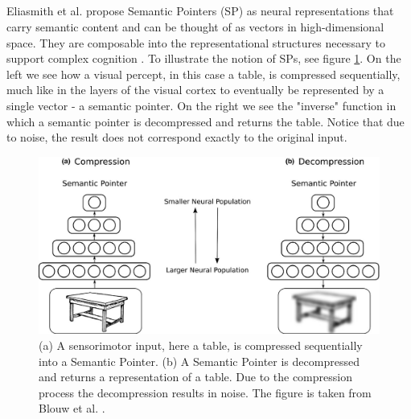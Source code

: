 \subsection{}
Eliasmith et al. propose Semantic Pointers (SP) as neural representations that carry semantic content and can be thought of as vectors in high-dimensional space. They are composable into the representational structures necessary to support complex cognition \cite{eliasmith2013build}. To illustrate the notion of SPs, see figure \ref{fig:sp}. On the left we see how a visual percept, in this case a table, is compressed sequentially, much like in the layers of the visual cortex to eventually be represented by a single vector - a semantic pointer. 
    On the right we see the "inverse" function in which a semantic pointer is decompressed and returns the table. Notice that due to noise, the result does not correspond exactly to the original input. 

\begin{figure}
    \centering
    \includegraphics[width=\textwidth]{../img/semPointer.jpg}
    \caption{(a) A sensorimotor input, here a table, is compressed sequentially into a Semantic Pointer. (b) A Semantic Pointer is decompressed and returns a representation of a table. Due to the compression process the decompression results in noise. The figure is taken from Blouw et al. \cite{blouw2016concepts}.}
    \label{fig:sp}
\end{figure}















































